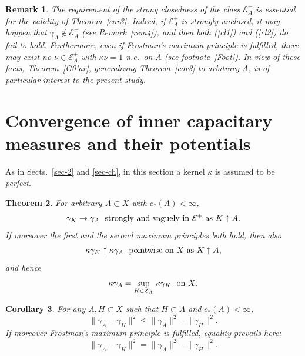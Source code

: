 \documentclass[12pt,a4paper,reqno]{amsart} %
\theoremstyle{lause}
\theoremstyle{maaritelma}
\theoremstyle{lause}
\newtheorem{theorem}{Theorem}[section]
\newtheorem{corollary}[theorem]{Corollary}
\theoremstyle{maaritelma}
\newtheorem{remark}[theorem]{Remark}
\numberwithin{equation}{section}
\begin{document}
\begin{remark}\label{closedness}
  The requirement of the strong closedness of the class $\mathcal E^+_A$ is essential for the validity of Theorem~\ref{cor3}. Indeed, if $\mathcal E^+_A$ is strongly unclosed, it may happen that $\gamma_A\not\in\mathcal E^+_A$ (see  Remark~\ref{rem4}), and then both (\ref{cl1}) and (\ref{cl2}) do fail to hold. Furthermore, even if Frostman's maximum principle is fulfilled, there may exist no $\nu\in\mathcal E^+_A$ with $\kappa\nu=1$ n.e.\ on $A$ (see footnote~\ref{Foot}). In view of these facts, Theorem~\ref{G0'ar}, generalizing Theorem~\ref{cor3} to {\it arbitrary\/} $A$, is of particular interest to the present study.
\end{remark}


\section{Convergence of inner capacitary measures and their potentials}\label{sec-conv}

As in Sects.~\ref{sec-2} and \ref{sec-ch}, in this section a kernel $\kappa$ is assumed to be {\it perfect}.

\begin{theorem}\label{cor2}For arbitrary\/ $A\subset X$ with\/ $c_*(A)<\infty$,
\begin{equation}\label{eq4}\gamma_K\to\gamma_A\text{ \ strongly and vaguely in\/ $\mathcal E^+$ as\/ $K\uparrow A$.}\end{equation}
If moreover the first and the second maximum principles both hold,
then also
\begin{equation*}\label{eq5}\kappa\gamma_K\uparrow\kappa\gamma_A\text{ \ pointwise on\/ $X$ as\/ $K\uparrow A$,}\end{equation*}
and hence
\begin{equation}\label{eq6}\kappa\gamma_A=\sup_{K\in\mathfrak C_A}\,\kappa\gamma_K\text{ \ on\/ $X$.}\end{equation}
\end{theorem}

\begin{corollary}\label{prop.1.11} For any\/ $A,H\subset X$ such that\/ $H\subset A$ and\/ $c_*(A)<\infty$,
\begin{equation}\label{eq.1.11}\|\gamma_A-\gamma_H\|^2\leqslant\|\gamma_A\|^2-\|\gamma_H\|^2.\end{equation}
If moreover Frostman's maximum principle is fulfilled, equality prevails here:
\begin{equation}\label{eq.1.111}\|\gamma_A-\gamma_H\|^2=\|\gamma_A\|^2-\|\gamma_H\|^2.\end{equation}
\end{corollary}
\end{document}
